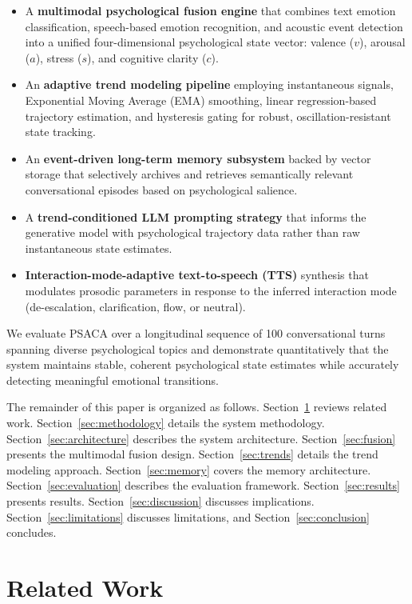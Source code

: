 \documentclass[conference]{IEEEtran}
\begin{document}
\begin{itemize}
    \item A \textbf{multimodal psychological fusion engine} that combines text emotion classification, speech-based emotion recognition, and acoustic event detection into a unified four-dimensional psychological state vector: valence ($v$), arousal ($a$), stress ($s$), and cognitive clarity ($c$).
    \item An \textbf{adaptive trend modeling pipeline} employing instantaneous signals, Exponential Moving Average (EMA) smoothing, linear regression-based trajectory estimation, and hysteresis gating for robust, oscillation-resistant state tracking.
    \item An \textbf{event-driven long-term memory subsystem} backed by vector storage that selectively archives and retrieves semantically relevant conversational episodes based on psychological salience.
    \item A \textbf{trend-conditioned LLM prompting strategy} that informs the generative model with psychological trajectory data rather than raw instantaneous state estimates.
    \item \textbf{Interaction-mode-adaptive text-to-speech (TTS)} synthesis that modulates prosodic parameters in response to the inferred interaction mode (de-escalation, clarification, flow, or neutral).
\end{itemize}

We evaluate PSACA over a longitudinal sequence of 100 conversational turns spanning diverse psychological topics and demonstrate quantitatively that the system maintains stable, coherent psychological state estimates while accurately detecting meaningful emotional transitions.

The remainder of this paper is organized as follows. Section~\ref{sec:related} reviews related work. Section~\ref{sec:methodology} details the system methodology. Section~\ref{sec:architecture} describes the system architecture. Section~\ref{sec:fusion} presents the multimodal fusion design. Section~\ref{sec:trends} details the trend modeling approach. Section~\ref{sec:memory} covers the memory architecture. Section~\ref{sec:evaluation} describes the evaluation framework. Section~\ref{sec:results} presents results. Section~\ref{sec:discussion} discusses implications. Section~\ref{sec:limitations} discusses limitations, and Section~\ref{sec:conclusion} concludes.

\section{Related Work}
\label{sec:related}
\end{document}
